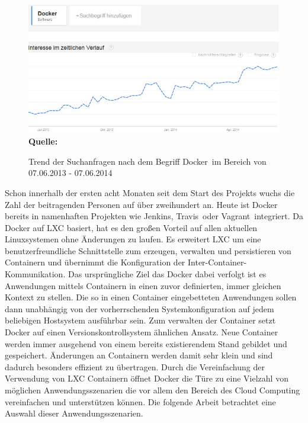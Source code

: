 \begin{figure}[htb]
  \centering  
  \includegraphics[scale=0.7]{img/docker_trend.JPG}\\
  \footnotesize\sffamily\textbf{Quelle:} \cite{google_trends_google_2014}
  \caption{Trend der Suchanfragen nach dem Begriff \grq Docker\grq\ im Bereich von 07.06.2013 - 07.06.2014 }
  \label{fig:google_trends}
\end{figure}

Schon innerhalb der ersten acht Monaten seit dem Start des Projekts wuchs die Zahl der beitragenden Personen auf über zweihundert an. 
Heute ist Docker bereits in namenhaften Projekten wie \grq Jenkins\grq , \grq Travis\grq\ oder \grq Vagrant\grq\ integriert. \cite{hykes_docker_2013}
Da Docker auf LXC basiert, hat es den großen Vorteil auf allen aktuellen Linuxsystemen ohne Änderungen zu laufen. Es erweitert LXC um eine benutzerfreundliche Schnittstelle zum erzeugen, verwalten und persistieren von Containern und übernimmt die Konfiguration der Inter-Container-
Kommunikation. Das ursprüngliche Ziel das Docker dabei verfolgt ist es Anwendungen mittels Containern in einen zuvor definierten, immer gleichen Kontext zu stellen. Die so in einen Container eingebetteten Anwendungen sollen dann unabhängig von der vorherrschenden Systemkonfiguration auf jedem beliebigen Hostsystem ausführbar sein.
Zum verwalten der Container setzt Docker auf einen Versionskontrollsystem ähnlichen Ansatz.
Neue Container werden immer ausgehend von einem bereits existierendem Stand gebildet und gespeichert. Änderungen an Containern werden damit sehr klein und sind dadurch besonders effizient zu übertragen.
Durch die Vereinfachung der Verwendung von LXC Containern öffnet Docker die Türe zu eine Vielzahl von möglichen Anwendungsszenarien die vor allem den Bereich des Cloud Computing vereinfachen und unterstützen können.
Die folgende Arbeit betrachtet eine Auswahl dieser Anwendungsszenarien.